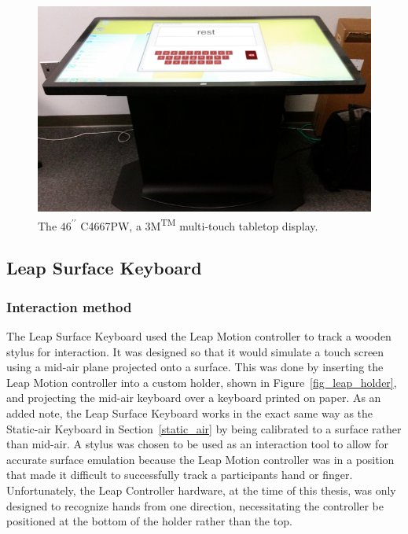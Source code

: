\begin{figure}[!b]
	\centering
	\includegraphics[width=5in]{Figures/fig_3m_display}
	\caption[3M\textsuperscript{TM} Multi-touch Display]{The $46^{\prime\prime}$ C4667PW, a 3M\textsuperscript{TM} multi-touch tabletop display.}
	\label{fig_3m_display}
\end{figure}

\subsection{Leap Surface Keyboard} \label{leap_surface}
\subsubsection{Interaction method}
The Leap Surface Keyboard used the Leap Motion controller to track a wooden stylus for interaction. It was designed so that it would simulate a touch screen using a mid-air plane projected onto a surface. This was done by inserting the Leap Motion controller into a custom holder, shown in Figure~\ref{fig_leap_holder}, and projecting the mid-air keyboard over a keyboard printed on paper. As an added note, the Leap Surface Keyboard works in the exact same way as the Static-air Keyboard in Section~\ref{static_air} by being calibrated to a surface rather than mid-air. A stylus was chosen to be used as an interaction tool to allow for accurate surface emulation because the Leap Motion controller was in a position that made it difficult to successfully track a participants hand or finger. Unfortunately, the Leap Controller hardware, at the time of this thesis, was only designed to recognize hands from one direction, necessitating the controller be positioned at the bottom of the holder rather than the top.

